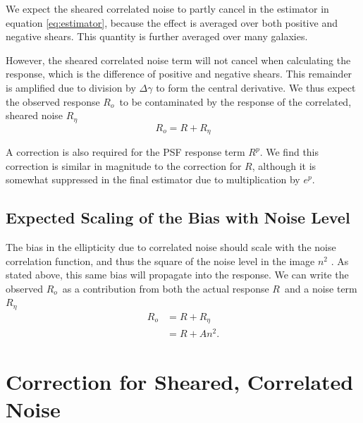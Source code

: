 \documentclass[usegraphicx,usenatbib]{mn2e}
\newcommand{\mcalR}{$R$}
\newcommand{\mcalRpsf}{$R^{p}$}
\newcommand{\mcalRo}{$R_o$}
\newcommand{\mcalRnoise}{$R_\eta$}
\begin{document}
We expect the sheared correlated noise to partly cancel in the estimator in
equation \ref{eq:estimator}, because the effect is averaged over both positive
and negative shears. This quantity is further averaged over many galaxies.

However, the sheared correlated noise term will not cancel when calculating the
response, which is the difference of positive and negative shears.  This
remainder is amplified due to division by $\Delta \gamma$ to form the central
derivative.  We thus expect the observed response \mcalRo\ to be contaminated
by the response of the correlated, sheared noise \mcalRnoise\
\begin{equation}
    \mbox{\mcalRo}  =  R + \mbox{\mcalRnoise}
\end{equation}

A correction is also required for the PSF response term \mcalRpsf.  We find
this correction is similar in magnitude to the correction for \mcalR, although
it is somewhat suppressed in the final estimator due to multiplication by $e^p$.

\subsection{Expected Scaling of the Bias with Noise Level} \label{sec:scaling}

The bias in the ellipticity due to correlated noise should scale
with the noise correlation function, and thus the square of the noise level in
the image $n^2$ \citep{HirataCorrNoise}.  As stated above, this same bias will
propagate into the response.  We can write the observed \mcalRo\ as a contribution
from both the actual response \mcalR\ and a noise term \mcalRnoise\
\begin{align} \label{eq:scaling}
    \mbox{\mcalRo} &= R + \mbox{\mcalRnoise}  \nonumber \\
                   &= R + A n^2.
\end{align}

\section{Correction for Sheared, Correlated Noise} \label{sec:corr}

\end{document}
